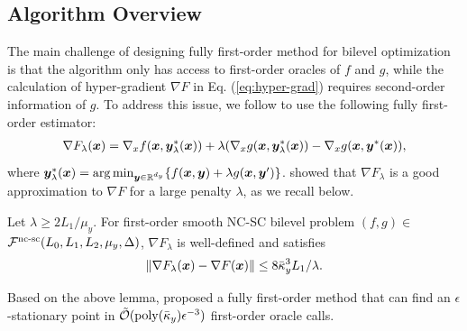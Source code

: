 \documentclass{article}
\begin{document}

\subsection{Algorithm Overview}

The main challenge of designing fully first-order method for bilevel optimization is that the algorithm only has access to first-order oracles of $f$ and $g$, while the calculation of hyper-gradient $\nabla F$ in Eq. (\ref{eq:hyper-grad}) requires second-order information of $g$. 
To address this issue, we follow \citet{kwon2023fully} to use the following fully first-order estimator:
\begin{align} \label{eq:f2ba-grad}
    \nabla F_{\lambda} ({\bm{x}}) = \nabla_x f({\bm{x}}, {\bm{y}}_{\lambda}^*({\bm{x}})) + \lambda ( \nabla_x g({\bm{x}}, {\bm{y}}_{\lambda}^*({\bm{x}})) - \nabla_x g({\bm{x}},{\bm{y}}^*({\bm{x}})),
\end{align}
where $ {\bm{y}}_{\lambda}^*({\bm{x}}) =  \arg \min_{{\bm{y}} \in {\mathbb{R}}^{d_y}} \{f({\bm{x}},{\bm{y}}) + \lambda g({\bm{x}},{\bm{y}}')\}$. \citet{kwon2023fully} showed that $\nabla F_{\lambda}$ is a good approximation to $\nabla F$ for a large penalty $\lambda$, as we recall below.
\begin{lem} Let $\lambda \ge 2 L_1/ \mu_y$. For first-order smooth NC-SC bilevel problem $(f,g) \in$ ${\mathcal{F}}^{\text{nc-sc}}(L_0,L_1,L_2,\mu_y,\Delta)$, 
$\nabla F_{\lambda}$ is well-defined and satisfies
\begin{align*}
    \Vert \nabla F_{\lambda}({\bm{x}}) - \nabla F({\bm{x}}) \Vert \le 8 \bar \kappa_y^3 L_1 / \lambda.
\end{align*}
\end{lem}
Based on the above lemma, \citet{kwon2023fully} proposed a fully first-order method that can find an $\epsilon$-stationary point in $\tilde {{\mathcal{O}}}({\rm poly}(\bar \kappa_y) \epsilon^{-3})$ first-order oracle calls. 
\end{document}
